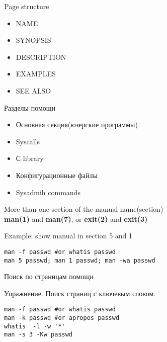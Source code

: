\begin{frame}[fragile]{Page structure}
		\begin{itemize}
			\item NAME
			\item SYNOPSIS
			\item DESCRIPTION
			\item EXAMPLES
			\item SEE ALSO
		\end{itemize}
\end{frame}

\begin{frame}[fragile]{Разделы помощи}
	\begin{itemize}
		\item[1] Основная секция(юзерские программы)
		\item[2] Syscalls
		\item[3] С library
		\item[5] Конфигурационные файлы
		\item[8] Sysadmih commands
	\end{itemize}
\end{frame}

\begin{frame}[fragile]{More than one section of the manual}
	name(section)  \\ 
	\textbf{man(1)} and \textbf{man(7)}, or \textbf{exit(2)} and \textbf{exit(3)} \\
     \begin{block}{Example: show manual in section 5 and 1}
        \begin{lstlisting}
man -f passwd #or whatis passwd 
man 5 passwd; man 1 passwd; man -wa passwd
        \end{lstlisting}
    \end{block}
\end{frame}

\begin{frame}[fragile]{Поиск по страницам помощи}
     \begin{block}{Упражнение. Поиск страниц с ключевым словом.}
        \begin{lstlisting}
man -f passwd #or whatis passwd 
man -k passwd #or apropos passwd 
whatis  -l -w '*'
man -s 3 -Kw passwd
        \end{lstlisting}
    \end{block}
\end{frame}


